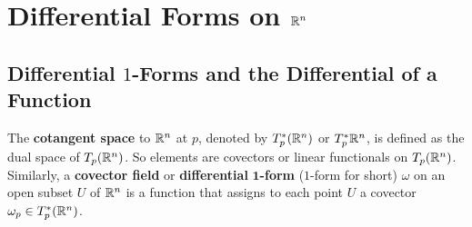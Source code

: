 \section{Differential Forms on $\mathbb{R}^n $}
\subsection{Differential $1$-Forms and the Differential of a Function}
The \textbf{cotangent space} to $\mathbb{R}^n $ at $p$, denoted by $T_p^*(\mathbb{R}^n )$ or $T_p^* \mathbb{R}^n $, is defined as the dual space of $T_p(\mathbb{R}^n )$. So elements are covectors or linear functionals on $T_p(\mathbb{R}^n )$. Similarly, a \textbf{covector field} or \textbf{differential} $\mathbf 1$\textbf{-form} ($1$-form for short) $\omega$ on an open subset $U$ of $\mathbb{R}^n $ is a function that assigns to each point $U$ a covector $\omega_p \in T_p^*(\mathbb{R}^n )$.

